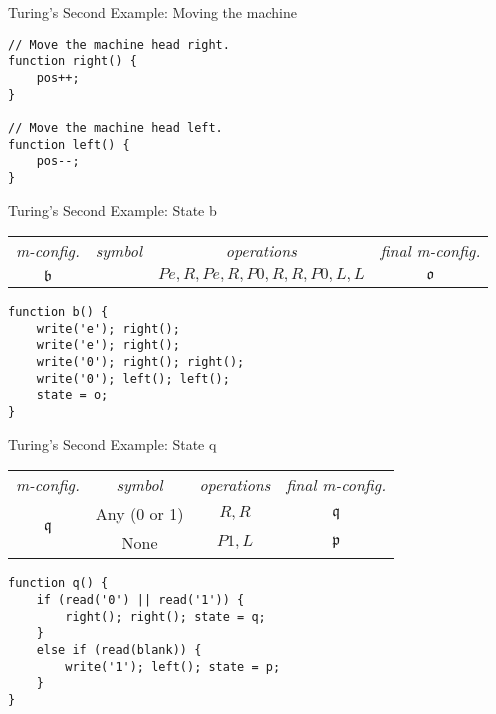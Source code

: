 \begin{frame}[fragile]{Turing's Second Example: Moving the machine}
\begin{verbatim}
// Move the machine head right.
function right() {
	pos++;
}

// Move the machine head left.
function left() {
	pos--;
}
\end{verbatim}
\end{frame}


\begin{frame}[fragile]{Turing's Second Example: State b}
\begin{table}
    \centering
    \begin{tabular}{cccc}
      \emph{m-config.}  & \emph{symbol}  & \emph{operations} & \emph{final m-config.} \\
      $\mathfrak{b}$ & & $Pe,R,Pe,R,P0,R,R,P0,L,L$  & $\mathfrak{o}$
    \end{tabular}
  \end{table}

\begin{verbatim}
function b() {
	write('e'); right();
	write('e'); right();
	write('0'); right(); right();
	write('0'); left(); left();
	state = o;
}
\end{verbatim}
\end{frame}


\begin{frame}[fragile]{Turing's Second Example: State q}
\begin{table}
    \centering
    \begin{tabular}{cccc}
      \emph{m-config.}  & \emph{symbol}  & \emph{operations} & \emph{final m-config.} \\
      \multirow{2}{*}{$\mathfrak{q}$} & Any (0 or 1) & $R,R$ & $\mathfrak{q}$ \\
      & None & $P1,L$ & $\mathfrak{p}$ \\
    \end{tabular}
  \end{table}

\begin{verbatim}
function q() {
	if (read('0') || read('1')) {
		right(); right(); state = q;
	}
	else if (read(blank)) {
		write('1'); left(); state = p;
	}
}
\end{verbatim}
\end{frame}
